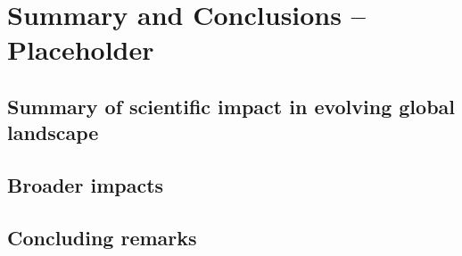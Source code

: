 \chapter{Summary and Conclusions -- Placeholder}
\label{ch:summ-concl}


\section{Summary of scientific impact in evolving global landscape}
\label{ch:summ-concl-global}


\section{Broader impacts}
\label{ch:summ-concl-broad}


\section{Concluding remarks}
\label{ch:summ-concl-rem}